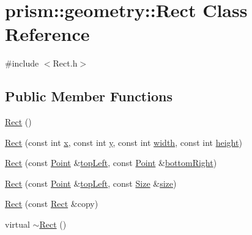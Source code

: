 \hypertarget{classprism_1_1geometry_1_1_rect}{}\section{prism\+:\+:geometry\+:\+:Rect Class Reference}
\label{classprism_1_1geometry_1_1_rect}


{\ttfamily \#include $<$Rect.\+h$>$}

\subsection*{Public Member Functions}
\begin{DoxyCompactItemize}
\item 
\hyperlink{classprism_1_1geometry_1_1_rect_af5f00aa1b738402869b2e5a50680dbf0}{Rect} ()
\item 
\hyperlink{classprism_1_1geometry_1_1_rect_a4aa4330e221ec6d07932ecd08f56406a}{Rect} (const int \hyperlink{classprism_1_1geometry_1_1_rect_a7ecf0e30c1485b8b6ed1c83625e0ce4c}{x}, const int \hyperlink{classprism_1_1geometry_1_1_rect_aae87aa965538d7d9ba24050d111fbd0f}{y}, const int \hyperlink{classprism_1_1geometry_1_1_rect_afe228be73477fba4bb5865c23d2761f2}{width}, const int \hyperlink{classprism_1_1geometry_1_1_rect_afe44f3f138f24808dba2bd807dbbe832}{height})
\item 
\hyperlink{classprism_1_1geometry_1_1_rect_a5b15bd9dbd9e4ab7ef96e3df75e93f98}{Rect} (const \hyperlink{classprism_1_1geometry_1_1_point}{Point} \&\hyperlink{classprism_1_1geometry_1_1_rect_ae1286050e3e1d841e065170e6fa213d2}{top\+Left}, const \hyperlink{classprism_1_1geometry_1_1_point}{Point} \&\hyperlink{classprism_1_1geometry_1_1_rect_a16a9088be2bfd87437286a23aed2094c}{bottom\+Right})
\item 
\hyperlink{classprism_1_1geometry_1_1_rect_a9cbd754e99927217fd508b3365fe7498}{Rect} (const \hyperlink{classprism_1_1geometry_1_1_point}{Point} \&\hyperlink{classprism_1_1geometry_1_1_rect_ae1286050e3e1d841e065170e6fa213d2}{top\+Left}, const \hyperlink{classprism_1_1geometry_1_1_size}{Size} \&\hyperlink{classprism_1_1geometry_1_1_rect_a5f848db57909f09943fc21fd45a41da2}{size})
\item 
\hyperlink{classprism_1_1geometry_1_1_rect_aaf42c3ce8864789cc9bf28ac49e7242c}{Rect} (const \hyperlink{classprism_1_1geometry_1_1_rect}{Rect} \&copy)
\item 
virtual \hyperlink{classprism_1_1geometry_1_1_rect_a454fcbd614d4aab447d91e84d023a394}{$\sim$\+Rect} ()

\end{DoxyCompactItemize}
